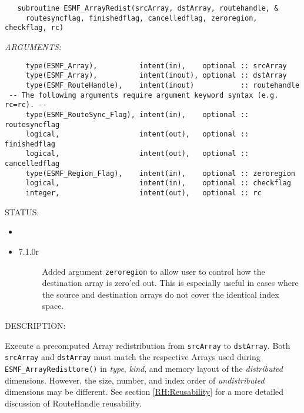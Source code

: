   
\begin{verbatim}   subroutine ESMF_ArrayRedist(srcArray, dstArray, routehandle, &
     routesyncflag, finishedflag, cancelledflag, zeroregion, checkflag, rc)\end{verbatim}{\em ARGUMENTS:}
\begin{verbatim}     type(ESMF_Array),          intent(in),    optional :: srcArray
     type(ESMF_Array),          intent(inout), optional :: dstArray
     type(ESMF_RouteHandle),    intent(inout)           :: routehandle
 -- The following arguments require argument keyword syntax (e.g. rc=rc). --
     type(ESMF_RouteSync_Flag), intent(in),    optional :: routesyncflag
     logical,                   intent(out),   optional :: finishedflag
     logical,                   intent(out),   optional :: cancelledflag
     type(ESMF_Region_Flag),    intent(in),    optional :: zeroregion
     logical,                   intent(in),    optional :: checkflag
     integer,                   intent(out),   optional :: rc\end{verbatim}
{\sf STATUS:}
   \begin{itemize}
   \item{}
   \item{}
   \begin{description}
   \item[7.1.0r] Added argument {\tt zeroregion} to allow user to control
                how the destination array is zero'ed out. This is especially
                useful in cases where the source and destination arrays do not
                cover the identical index space.
   \end{description}
   \end{itemize}
  
{\sf DESCRIPTION:\\ }


     \begin{sloppypar}
     Execute a precomputed Array redistribution from {\tt srcArray}
     to {\tt dstArray}.
     Both {\tt srcArray} and {\tt dstArray} must match the respective Arrays
     used during {\tt ESMF\_ArrayRedisttore()} in {\em type}, {\em kind}, and 
     memory layout of the {\em distributed} dimensions. However, the size,
     number, and index order of {\em undistributed} dimensions may be different.
     See section \ref{RH:Reusability} for a more detailed discussion of
     RouteHandle reusability.
     \end{sloppypar}
  
